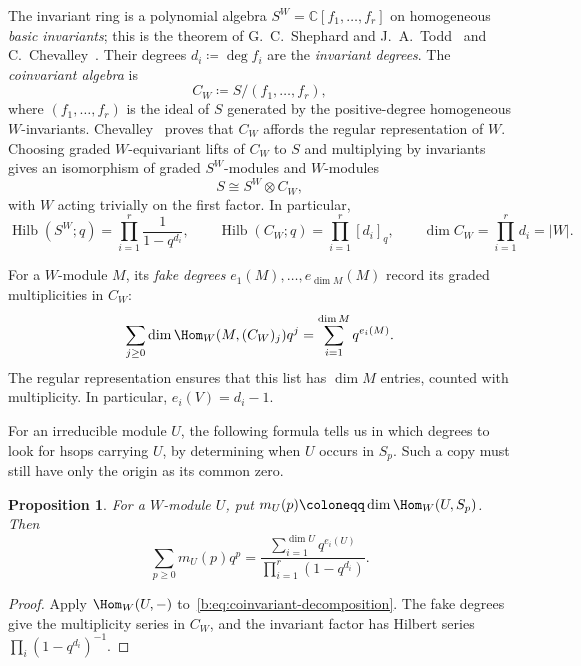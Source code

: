 \documentclass[11pt]{amsart}
\newcommand{\defeq}{\coloneqq}
\newcommand{\defn}[1]{\emph{\color{darkblue}#1}}
\newtheorem{proposition}[theorem]{Proposition}
\theoremstyle{definition}
\newcommand{\C}{\mathbb C}\newcommand{\Q}{\mathbb Q}
\DeclareMathOperator{\Hilb}{Hilb}\DeclareMathOperator{\Res}{Res}
\begin{document}
The invariant ring is a polynomial algebra
$S^W=\C[f_1,\ldots,f_r]$ on homogeneous \defn{basic invariants}; this is
the theorem of G.~C.~Shephard and J.~A.~Todd~\cite{ST} and C.~Chevalley~\cite{Chevalley}.
Their degrees $d_i\defeq\deg f_i$ are the \defn{invariant degrees}.
The \defn{coinvariant algebra} is
\[
 C_W\defeq S/(f_1,\ldots,f_r),
\]
where $(f_1,\ldots,f_r)$ is the ideal of $S$ generated by the
positive-degree homogeneous $W$-invariants.
Chevalley~\cite{Chevalley} proves that $C_W$ affords the regular
representation of $W$. Choosing graded $W$-equivariant lifts of
$C_W$ to $S$ and multiplying by invariants gives an isomorphism
of graded $S^W$-modules and $W$-modules
\begin{equation}\label{b:eq:coinvariant-decomposition}
 S\cong S^W\otimes C_W,
\end{equation}
with $W$ acting trivially on the first factor.
In particular,
\[
 \Hilb(S^W;q)=\prod_{i=1}^r\frac1{1-q^{d_i}},\qquad
 \Hilb(C_W;q)=\prod_{i=1}^r[d_i]_q,\qquad
 \dim C_W=\prod_{i=1}^r d_i=|W|.
\]

For a $W$-module $M$, its \defn{fake degrees}
$e_1(M),\ldots,e_{\dim M}(M)$ record its graded multiplicities in $C_W$:
\[
 \sum_{j\ge0}\dim\Hom_W(M,(C_W)_j)q^j
       =\sum_{i=1}^{\dim M}q^{e_i(M)}.
\]
The regular representation ensures that this list has $\dim M$ entries,
counted with multiplicity. In particular, $e_i(V)=d_i-1$.

For an irreducible module $U$, the following formula tells us in which
degrees to look for hsops carrying $U$, by determining when $U$ occurs
in $S_p$. Such a copy must still have only the origin as its common zero.

\begin{proposition}\label{prop:hsop-multiplicity}
For a $W$-module $U$, put $m_U(p)\defeq\dim\Hom_W(U,S_p)$. Then
\[
 \sum_{p\ge0}m_U(p)q^p
 =\frac{\sum_{i=1}^{\dim U}q^{e_i(U)}}
        {\prod_{i=1}^r(1-q^{d_i})}.
\]
\end{proposition}
\begin{proof}
Apply $\Hom_W(U,-)$ to~\cref{b:eq:coinvariant-decomposition}.
The fake degrees give the multiplicity series in $C_W$, and the
invariant factor has Hilbert series $\prod_i(1-q^{d_i})^{-1}$.
\end{proof}
\end{document}
